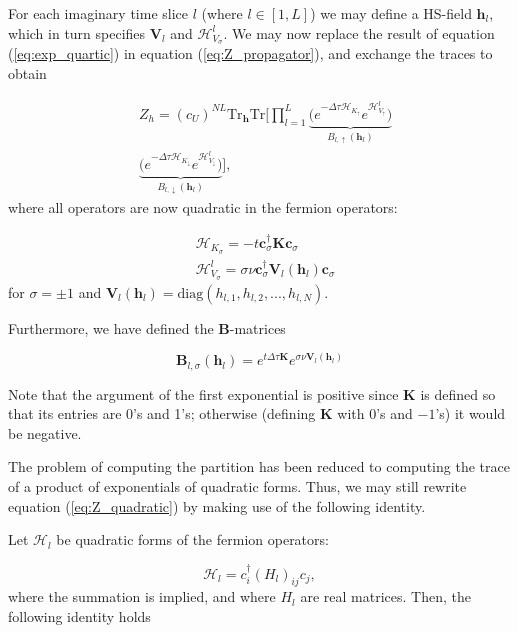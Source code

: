 \documentclass[10pt, twocolumn, twoside]{article}
\begin{document}
For each imaginary time slice $l$ (where $l \in [1, L]$) we may define a HS-field $\bm h_l$, which in turn specifies $\bm V_l$ and $\mathcal{H}_{V_\sigma}^l$. We may now replace the result of equation (\ref{eq:exp_quartic}) in equation (\ref{eq:Z_propagator}), and exchange the traces to obtain

\begin{equation}\label{eq:Z_quadratic}
\begin{split}
&Z_h = (c_U)^{NL} \text{Tr}_{\bm h} \text{Tr} \bigg[ \prod_{l=1}^L \underbrace{\bigg( e^{-\Delta\tau  \mathcal{H}_{K_\uparrow}} e^{\mathcal{H}_{V_\uparrow}^l} \bigg)}_{B_{l, \uparrow}(\bm h_l)} \\
&\underbrace{\bigg( e^{-\Delta\tau  \mathcal{H}_{K_\downarrow}} e^{\mathcal{H}_{V_\downarrow}^l} \bigg)}_{B_{l, \downarrow}(\bm h_l)} \bigg],
\end{split}
\end{equation}
where all operators are now quadratic in the fermion operators:

\begin{equation}
\begin{split}
&\mathcal{H}_{K_\sigma} = - t \bm c_\sigma^\dagger \bm K \bm c_\sigma \\
&\mathcal{H}_{V_\sigma}^l = \sigma \nu \bm c_\sigma^\dagger \bm V_l (\bm h_l) \bm c_\sigma
\end{split}
\end{equation}
for $\sigma = \pm 1$ and $\bm V_l ( \bm h_l ) = \text{diag} ( h_{l, 1} , h_{l, 2}, ... , h_{l, N} )$.

Furthermore, we have defined the $\bm B$-matrices

\begin{equation}
\bm B_{l, \sigma} ( \bm h_l ) = e^{t \Delta \tau \bm K} e^{\sigma \nu \bm V_l (\bm h_l)}
\end{equation}

Note that the argument of the first exponential is positive since $\bm K$ is defined so that its entries are 0's and 1's; otherwise (defining $\bm K$ with 0's and $-1$'s) it would be negative.

The problem of computing the partition has been reduced to computing the trace of a product of exponentials of quadratic forms. Thus, we may still rewrite equation (\ref{eq:Z_quadratic}) by making use of the following identity.

Let $\mathcal{H}_l$ be quadratic forms of the fermion operators:

\begin{equation}
\mathcal{H}_l = c_i^\dagger (H_l)_{ij} c_j,
\end{equation}
where the summation is implied, and where $H_l$ are real matrices. Then, the following identity holds
\end{document}
